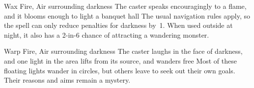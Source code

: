 \ifodd\value{diceNo}

  {}%
  {Wax}%
  {Fire, Air}%
  {surrounding darkness}%
  {The caster speaks encouragingly to a flame, and it blooms enough to light a banquet hall}%
  {The usual \gls{navigation} rules apply, so the spell can only reduce penalties for darkness by~1.
  When used outside at night, it also has a 2-in-6 chance of attracting a wandering \gls{monster}.}

\else

  {}%
  {Warp}%
  {Fire, Air}%
  {surrounding darkness}%
  {The caster laughs in the face of darkness, and one light in the area lifts from its source, and wanders free}%
  {Most of these floating lights wander in circles, but others leave to seek out their own goals.
  Their reasons and aims remain a mystery.}

\fi
{}
